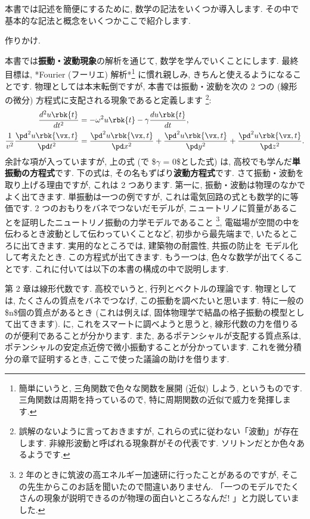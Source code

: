\documentclass[openany, a4paper, oneside]{jsbook}
\begin{document}
本書では記述を簡便にするために, 数学の記法をいくつか導入します.
その中で基本的な記法と概念をいくつかここで紹介します.

作りかけ.

本書では\textbf{振動・波動現象}の解析を通じて, 数学を学んでいくことにします.
最終目標は, *Fourier (フーリエ) 解析*\footnote{簡単にいうと, 三角関数で色々な関数を展開 (近似) しよう, というものです.
三角関数は周期を持っているので, 特に周期関数の近似で威力を発揮します.}
に慣れ親しみ, きちんと使えるようになることです.
物理としては本末転倒ですが,
本書では振動・波動を次の 2 つの (線形の微分) 方程式に支配される現象であると定義します \footnote{誤解のないように言っておきますが, これらの式に従わない「波動」が存在します.
非線形波動と呼ばれる現象群がその代表です.
ソリトンだとか色々あるようです.}:
\begin{align}
 \frac{d^2 u \rbk{t} }{d t^2}
 &=
 -\omega^2 u \rbk{t} - \gamma \frac{d u \rbk{t}}{dt} , \\
 \frac{1}{v^2} \frac{\pd^2 u \rbk{ \vx , t }}{\pd t^2}
 &=
 \frac{\pd^2 u \rbk{\vx , t}}{\pd x^2} + \frac{\pd^2 u \rbk{\vx , t}}{\pd y^2} + \frac{\pd^2 u \rbk{\vx , t}}{\pd z^2}.
\end{align}
余計な項が入っていますが, 上の式 (で \$$\gamma$ = 0\$とした式) は,
高校でも学んだ\textbf{単振動の方程式}です.
下の式は, その名もずばり\textbf{波動方程式}です.
さて振動・波動を取り上げる理由ですが, これは 2 つあります.
第一に, 振動・波動は物理のなかでよく出てきます.
単振動は一つの例ですが, これは電気回路の式とも数学的に等価です.
2 つのおもりをバネでつないだモデルが,
ニュートリノに質量があることを証明したニュートリノ振動の力学モデルであること \footnote{2 年のときに筑波の高エネルギー加速研に行ったことがあるのですが,
そこの先生からこのお話を聞いたので間違いありません.
「一つのモデルでたくさんの現象が説明できるのが物理の面白いところなんだ! 」と力説していました.},
電磁場が空間の中を伝わるとき波動として伝わっていくことなど,
初歩から最先端まで, いたるところに出てきます.
実用的なところでは, 建築物の耐震性, 共振の防止を
モデル化して考えたとき. この方程式が出てきます.
もう一つは, 色々な数学が出てくることです.
これに付いては以下の本書の構成の中で説明します.

第 2 章は線形代数です.
高校でいうと, 行列とベクトルの理論です.
物理としては, たくさんの質点をバネでつなげ, この振動を調べたいと思います.
特に一般の \$n\$個の質点があるとき (これは例えば, 固体物理学で結晶の格子振動の模型として出てきます). に,
これをスマートに調べようと思うと,
線形代数の力を借りるのが便利であることが分かります.
また, あるポテンシャルが支配する質点系は,
ポテンシャルの安定点近傍で微小振動することが分かっています.
これを微分積分の章で証明するとき, ここで使った議論の助けを借ります.
\end{document}

